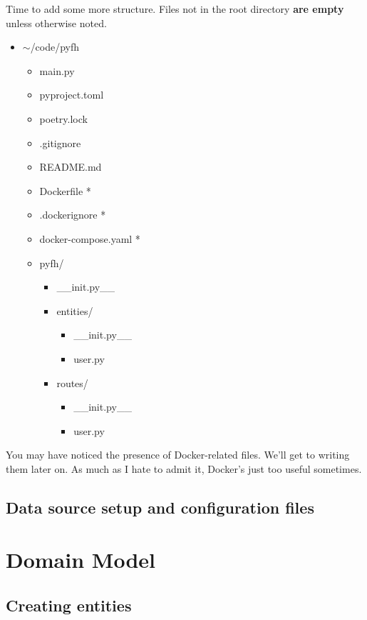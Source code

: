 \documentclass[14pt]{extarticle}
\begin{document}
Time to add some more structure. Files not in the root directory \textbf{are empty} unless otherwise noted.

{\ttfamily
\begin{itemize}
    \item{$\sim$/code/pyfh}
        \begin{itemize}
            \item{main.py}
            \item{pyproject.toml}
            \item{poetry.lock}
            \item{.gitignore}
            \item{README.md}
            \item{Dockerfile *}
            \item{.dockerignore *}
            \item{docker-compose.yaml *}
            \item{pyfh/}
                \begin{itemize}
                    \item{\_\_init.py\_\_}
                    \item{entities/}
                        \begin{itemize}
                            \item{\_\_init.py\_\_}
                            \item{user.py}
                        \end{itemize}
                    \item{routes/}
                        \begin{itemize}
                            \item{\_\_init.py\_\_}
                            \item{user.py}
                        \end{itemize}
                \end{itemize}
        \end{itemize}
\end{itemize}
}

You may have noticed the presence of Docker-related files. We'll get to writing them later on. As much as I hate to admit it, Docker's just too useful sometimes.

\subsection{Data source setup and configuration files}

\section{Domain Model}

\subsection{Creating entities}
\end{document}
